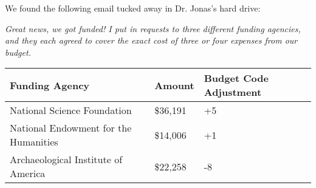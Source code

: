 We found the following email tucked away in Dr. Jonas's hard drive:

\textit{Great news, we got funded! I put in requests to three different funding agencies,
and they each agreed to cover the exact cost of three or four expenses from our budget.}

\begin{center}
\begin{tabular}{lll}
\textbf{Funding Agency}                        & \textbf{Amount}   & \textbf{Budget Code Adjustment} \\\hline
National Science Foundation           & \$36,191 & +5                     \\
National Endowment for the Humanities & \$14,006 & +1                     \\
Archaeological Institute of America   & \$22,258 & -8                    
\end{tabular}
\end{center}
